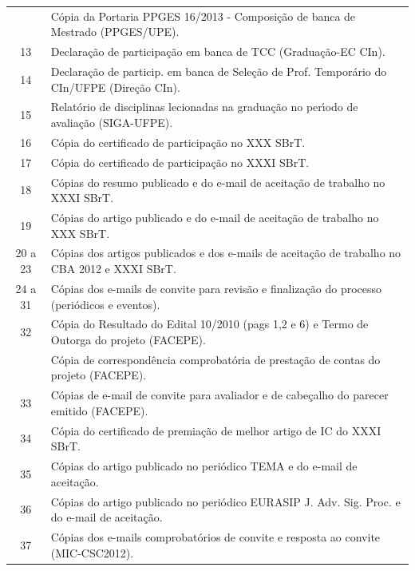 \documentclass[a4paper,oneside,10pt]{article}
\begin{document}
\begin{table}[h]
\begin{tabular}{cl}
     & C\'{o}pia da Portaria PPGES 16/2013 - Composi\c{c}\~{a}o de banca de Mestrado (PPGES/UPE). \\
  \cmidrule{1-2}
  13 & Declara\c{c}\~{a}o de participa\c{c}\~{a}o em banca de TCC (Gradua\c{c}\~{a}o-EC CIn). \\
  14 & Declara\c{c}\~{a}o de particip. em banca de Sele\c{c}\~{a}o de Prof. Tempor\'{a}rio do CIn/UFPE (Dire\c{c}\~{a}o CIn). \\
  15 & Relat\'{o}rio de disciplinas lecionadas na gradua\c{c}\~{a}o no per\'{\i}odo de avalia\c{c}\~{a}o (SIGA-UFPE).\\
  16 & C\'{o}pia do certificado de participa\c{c}\~{a}o no XXX SBrT. \\
  17 & C\'{o}pia do certificado de participa\c{c}\~{a}o no XXXI SBrT. \\
  18 & C\'{o}pias do resumo publicado e do e-mail de aceita\c{c}\~{a}o de trabalho no XXXI SBrT. \\
  19 & C\'{o}pias do artigo publicado e do e-mail de aceita\c{c}\~{a}o de trabalho no XXX SBrT. \\
  20 a 23 & C\'{o}pias dos artigos publicados e dos e-mails de aceita\c{c}\~{a}o de trabalho no CBA 2012 e XXXI SBrT. \\
  24 a 31 & C\'{o}pias dos e-mails de convite para revis\~{a}o e finaliza\c{c}\~{a}o do processo (peri\'{o}dicos e eventos). \\
  \cmidrule{1-2}
  32 & C\'{o}pia do Resultado do Edital 10/2010 (pags 1,2 e 6) e Termo de Outorga do projeto (FACEPE). \\
     & C\'{o}pia de correspond\^{e}ncia comprobat\'{o}ria de presta\c{c}\~{a}o de contas do projeto (FACEPE). \\
  \cmidrule{1-2}
  33 & C\'{o}pias de e-mail de convite para avaliador e de cabe\c{c}alho do parecer emitido (FACEPE). \\
  34 & C\'{o}pia do certificado de premia\c{c}\~{a}o de melhor artigo de IC do XXXI SBrT. \\
  35 & C\'{o}pias do artigo publicado no peri\'{o}dico TEMA e do e-mail de aceita\c{c}\~{a}o. \\
  36 & C\'{o}pias do artigo publicado no peri\'{o}dico EURASIP J. Adv. Sig. Proc. e do e-mail de aceita\c{c}\~{a}o. \\
  37 & C\'{o}pias dos e-mails comprobat\'{o}rios de convite e resposta ao convite (MIC-CSC2012). \\

\end{tabular}
\end{table}
\end{document}
